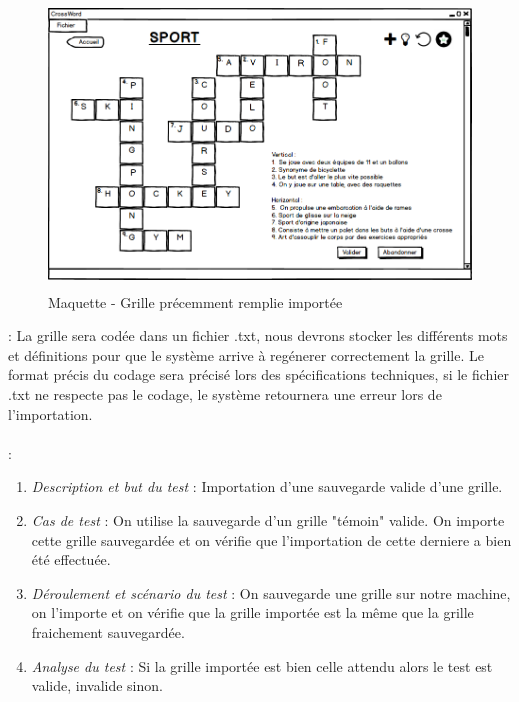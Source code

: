 \documentclass [ 11 pt ] {article}
\begin{document}
        \begin{figure}[H]
    \begin{center}
        \includegraphics[height=3in]{Maquettes/Grille_remplie.png}
        \caption{Maquette - Grille précemment remplie importée} 
        \end{center}
    \end{figure}



 : La grille sera codée dans un fichier .txt, nous devrons stocker les différents mots et définitions pour que le système arrive à regénerer correctement la grille.
Le format précis du codage sera précisé lors des spécifications techniques, si le fichier .txt ne respecte pas le codage, le système retournera une erreur lors de l'importation.\\ \\

\newpage
{} : 
\begin{tcolorbox}[colback=positifC]
            \begin{enumerate}
                \item \textit{Description et but du test }: Importation d'une sauvegarde valide d'une grille.
                
                \item \textit{Cas de test }: On utilise la sauvegarde d'un grille "témoin" valide. On importe cette grille sauvegardée et on vérifie que l'importation de cette derniere a bien été effectuée.
                
                \item \textit{Déroulement et scénario du test }: On sauvegarde une grille sur notre machine, on l'importe et on vérifie que la grille importée est la même que la grille fraichement sauvegardée.
                
                \item \textit{Analyse du test }: Si la grille  importée est bien celle attendu alors le test est valide, invalide sinon.
            \end{enumerate}
        \end{tcolorbox}
        
\end{document}
